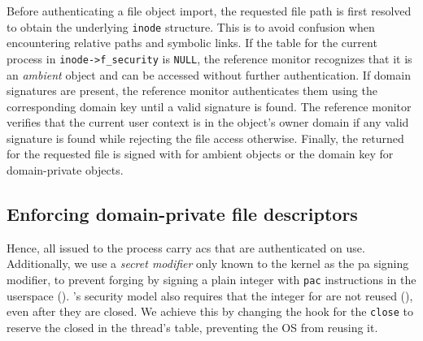 Before authenticating a file object import, the requested file path is first resolved to obtain the underlying \texttt{inode} structure.
This is to avoid confusion when encountering relative paths and symbolic links.
If the table for the current process in \texttt{inode->f\_security} is \texttt{NULL}, the reference monitor recognizes that it is an \emph{ambient} object and can be accessed without further authentication.
If domain signatures are present, the reference monitor authenticates them using the corresponding domain key until a valid signature is found.
The reference monitor verifies that the current user context is in the object's owner domain if any valid signature is found while rejecting the file access otherwise.
Finally, the returned \fd for the requested file is signed with  for ambient objects or the domain key for domain-private objects.






\subsection{Enforcing domain-private file descriptors}
\label{sec:design:fd}
Hence, all \fds issued to the process carry \glspl{ac} that are authenticated on use.
Additionally, we use a \emph{secret modifier} only known to the kernel as the \gls{pa} signing modifier, to prevent forging by signing a plain integer with \texttt{pac} instructions in the userspace (\srforge).
\thename's security model also requires that the integer for \fds are not reused (\srreuse), even after they are closed. 
We achieve this by changing the hook for the \texttt{close} to reserve the closed \fd in the thread's \fd table, preventing the OS from reusing it.

